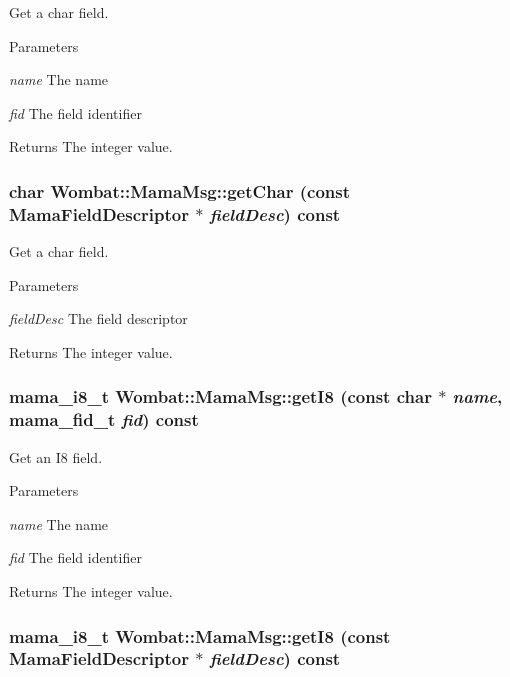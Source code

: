 Get a char field. 
\begin{DoxyParams}{Parameters}
\item[{\em name}]The name \item[{\em fid}]The field identifier \end{DoxyParams}
\begin{DoxyReturn}{Returns}
The integer value. 
\end{DoxyReturn}
\hypertarget{classWombat_1_1MamaMsg_a273a47c895900283806a71d8af790d06}{
\subsubsection[{getChar}]{\setlength{\rightskip}{0pt plus 5cm}char Wombat::MamaMsg::getChar (const {\bf MamaFieldDescriptor} $\ast$ {\em fieldDesc}) const}}
\label{classWombat_1_1MamaMsg_a273a47c895900283806a71d8af790d06}


Get a char field. 
\begin{DoxyParams}{Parameters}
\item[{\em fieldDesc}]The field descriptor \end{DoxyParams}
\begin{DoxyReturn}{Returns}
The integer value. 
\end{DoxyReturn}
\hypertarget{classWombat_1_1MamaMsg_a42a2c16c2be4610858498ac834f8c839}{
\subsubsection[{getI8}]{\setlength{\rightskip}{0pt plus 5cm}mama\_\-i8\_\-t Wombat::MamaMsg::getI8 (const char $\ast$ {\em name}, \/  mama\_\-fid\_\-t {\em fid}) const}}
\label{classWombat_1_1MamaMsg_a42a2c16c2be4610858498ac834f8c839}


Get an I8 field. 
\begin{DoxyParams}{Parameters}
\item[{\em name}]The name \item[{\em fid}]The field identifier \end{DoxyParams}
\begin{DoxyReturn}{Returns}
The integer value. 
\end{DoxyReturn}
\hypertarget{classWombat_1_1MamaMsg_ab7a9aa2455ae2a33949bf3bdadc6efbc}{
\subsubsection[{getI8}]{\setlength{\rightskip}{0pt plus 5cm}mama\_\-i8\_\-t Wombat::MamaMsg::getI8 (const {\bf MamaFieldDescriptor} $\ast$ {\em fieldDesc}) const}}
\label{classWombat_1_1MamaMsg_ab7a9aa2455ae2a33949bf3bdadc6efbc}


